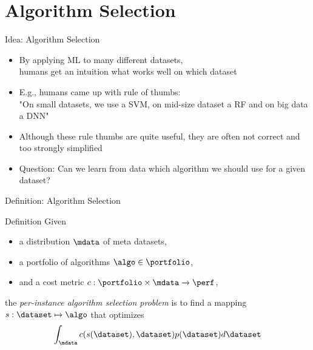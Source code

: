 \section{Algorithm Selection}
\begin{frame}[c]{Idea: Algorithm Selection}

\begin{itemize}
	\item By applying ML to many different datasets,\\
	humans get an intuition \alert{what works well on which dataset}
	\pause
	\item E.g., humans came up with rule of thumbs:\\
	"On small datasets, we use a SVM, on mid-size dataset a RF 
	and on big data a DNN"
	\pause
	\item Although these rule thumbs are quite useful,
	they are often not correct and too strongly simplified
	\pause
	\item \alert{Question}: Can we learn from data which algorithm we should use for a given dataset?
\end{itemize}


\end{frame}
\begin{frame}[c]{Definition: Algorithm Selection }

\begin{block}{Definition}
	Given 
	\begin{itemize}
		\item a \alert{distribution} $\mdata$ of meta datasets,
		\item a portfolio of algorithms $\algo \in \portfolio$,
		\item and a cost metric $c:  \portfolio \times \mdata \rightarrow \perf$,   
	\end{itemize}
	
	the \emph{per-instance algorithm selection problem} is to find a mapping 
	$s: \dataset \mapsto \algo$ 
	that optimizes 
	$$\int_{\mdata} c(s(\dataset),\dataset) p(\dataset)  d\dataset$$
\end{block}

\bigskip
\pause


\end{frame}
